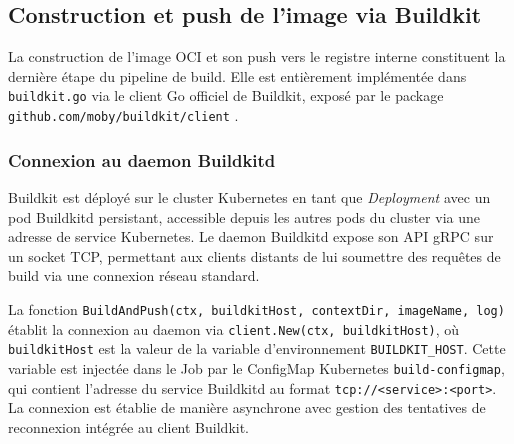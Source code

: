 
\subsection{Construction et push de l'image via Buildkit}

La construction de l'image OCI et son push vers le registre interne constituent la dernière étape du pipeline de build. Elle est entièrement implémentée dans \texttt{buildkit.go} via le client Go officiel de Buildkit, exposé par le package \texttt{github.com/moby/buildkit/client} \cite{buildkit-client}.

\subsubsection*{Connexion au daemon Buildkitd}

Buildkit est déployé sur le cluster Kubernetes en tant que \textit{Deployment} avec un pod Buildkitd persistant, accessible depuis les autres pods du cluster via une adresse de service Kubernetes. Le daemon Buildkitd expose son API gRPC sur un socket TCP, permettant aux clients distants de lui soumettre des requêtes de build via une connexion réseau standard. 

La fonction \texttt{BuildAndPush(ctx, buildkitHost, contextDir, imageName, log)} établit la connexion au daemon via \texttt{client.New(ctx, buildkitHost)}, où \texttt{buildkitHost} est la valeur de la variable d'environnement \texttt{BUILDKIT\_HOST}. Cette variable est injectée dans le Job par le ConfigMap Kubernetes \texttt{build-configmap}, qui contient l'adresse du service Buildkitd au format \texttt{tcp://<service>:<port>}. La connexion est établie de manière asynchrone avec gestion des tentatives de reconnexion intégrée au client Buildkit.


